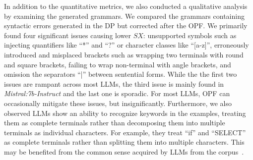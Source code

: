 In addition to the quantitative metrics, we also conducted a qualitative analysis by examining the generated grammars. We compared the grammars containing syntactic errors generated in the DP but corrected after the OPF. We primarily found four significant issues causing lower $SX$: unsupported symbols such as injecting quantifiers like ``*'' and ``?'' or character classes like ``[a-z]'', erroneously introduced and misplaced brackets such as wrapping two terminals with round and square brackets, failing to wrap non-terminal with angle brackets, and omission the separators ``|'' between sentential forms. While the the first two issues are rampant across most LLMs, the third issue is mainly found in \textit{Mistral:7b-Instruct} and the last one is sporadic. For most LLMs, OPF can occasionally mitigate these issues, but insignificantly. Furthermore, we also observed LLMs show an ability to recognize keywords in the examples, treating them as complete terminals rather than decomposing them into multiple terminals as individual characters. For example, they treat ``if'' and ``SELECT'' as complete terminals rather than splitting them into multiple characters. This may be benefited from the common sense acquired by LLMs from the corpus~\cite{llm_few_shot}. 


